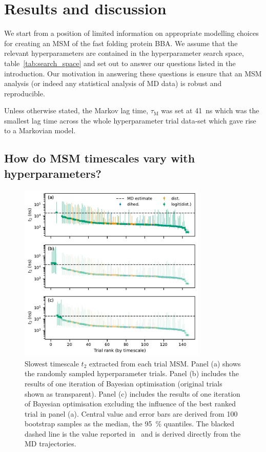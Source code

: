 \documentclass[journal=jacsat,manuscript=article]{achemso}
\begin{document}
\section{Results and discussion}

We start from a position of limited information on appropriate modelling choices for creating an MSM of the fast folding protein BBA.  We assume that the
relevant hyperparameters are contained in the  hyperparameter search space, table~\ref{tab:search_space} and set out to answer our questions listed in the introduction.  Our motivation in answering these questions is ensure that an MSM analysis (or indeed any statistical analysis of MD data) is robust and reproducible.  

Unless otherwise stated, the Markov lag time, $\tau_{\mathrm{M}}$ was set at \SI{41}{\nano\second} which was the smallest lag time across the whole hyperparameter trial data-set which gave rise to a Markovian model.  

\subsection{How do MSM timescales vary with hyperparameters?}

\begin{figure}
    \centering
    \includegraphics[width=0.8\textwidth]{figures/1fme_timescales.pdf}
    \caption{Slowest timescale $t_{2}$ extracted from each trial MSM. Panel (a) shows the randomly sampled hyperparameter trials. Panel (b) includes the results of one iteration of Bayesian optimisation (original trials shown as transparent). Panel (c) includes the results of one iteration of Bayesian optimisation excluding the influence of the best ranked trial in panel (a).  Central value and error bars are derived from 100 bootstrap samples as the median, the \SI{95}{\percent} quantiles. The blacked dashed line is the value  reported in~\cite{lindorff-larsen_how_2011} and is derived directly from the MD trajectories.} 
    \label{fig:1fme_timescales}
\end{figure}
\end{document}
